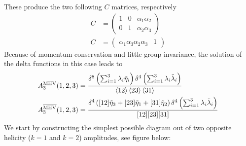 \documentclass[letter,11pt]{article}
\begin{document}
These produce the two following $C$ matrices, respectively
\begin{equation}
	\begin{aligned}
		C&=\begin{pmatrix}
			1 & 0 & \alpha_1\alpha_2 \\ 0 & 1 & \alpha_2\alpha_3
		\end{pmatrix}\\
	C&=\begin{pmatrix}
		\alpha_1\alpha_3 \alpha_2\alpha_3 & 1
	\end{pmatrix}
	\end{aligned}
\end{equation}
Because of momentum conservation and little group invariance, the solution of the delta functions in this case leads to 
\begin{equation}
	\begin{aligned}
		A_3^{\text{MHV}}(1,2,3)&=\frac{\delta^{8}\left(\sum_{i=1}^{3}\lambda_i\tilde\eta_i\right)\delta^{4}\left(\sum_{i=1}^{3}\lambda_i\tilde\lambda_i\right)}{\expval{12}\expval{23}\expval{31}}\\
		A_3^{\overline{\text{MHV}}}(1,2,3)&=\frac{\delta^{4}\left([12]\tilde\eta_3+[23]\tilde\eta_1+[31]\tilde\eta_2\right)\delta^{4}\left(\sum_{i=1}^{3}\lambda_i\tilde\lambda_i\right)}{[12][23][31]}\\
	\end{aligned}
\end{equation}
We start by constructing the simplest possible diagram out of two opposite helicity ($k=1$ and $k=2$) amplitudes, see figure below:
\begin{figure}[H]\centering\hspace*{3cm}
\end{figure}
\end{document}
